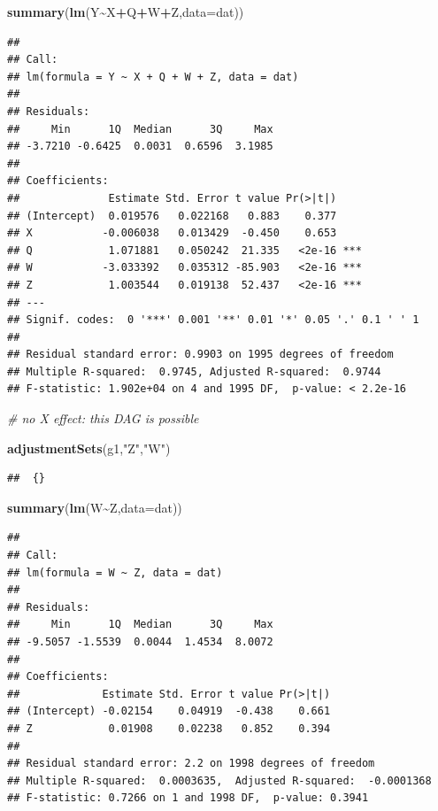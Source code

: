 \documentclass[
]{book}
\newenvironment{Shaded}{\begin{snugshade}}{\end{snugshade}}
\newcommand{\AttributeTok}[1]{\textcolor[rgb]{0.13,0.29,0.53}{#1}}
\newcommand{\CommentTok}[1]{\textcolor[rgb]{0.56,0.35,0.01}{\textit{#1}}}
\newcommand{\FunctionTok}[1]{\textcolor[rgb]{0.13,0.29,0.53}{\textbf{#1}}}
\newcommand{\NormalTok}[1]{#1}
\newcommand{\SpecialCharTok}[1]{\textcolor[rgb]{0.81,0.36,0.00}{\textbf{#1}}}
\newcommand{\StringTok}[1]{\textcolor[rgb]{0.31,0.60,0.02}{#1}}
\begin{document}
\begin{Shaded}
\begin{Highlighting}[]
\FunctionTok{summary}\NormalTok{(}\FunctionTok{lm}\NormalTok{(Y}\SpecialCharTok{\textasciitilde{}}\NormalTok{X}\SpecialCharTok{+}\NormalTok{Q}\SpecialCharTok{+}\NormalTok{W}\SpecialCharTok{+}\NormalTok{Z,}\AttributeTok{data=}\NormalTok{dat))}
\end{Highlighting}
\end{Shaded}

\begin{verbatim}
## 
## Call:
## lm(formula = Y ~ X + Q + W + Z, data = dat)
## 
## Residuals:
##     Min      1Q  Median      3Q     Max 
## -3.7210 -0.6425  0.0031  0.6596  3.1985 
## 
## Coefficients:
##              Estimate Std. Error t value Pr(>|t|)    
## (Intercept)  0.019576   0.022168   0.883    0.377    
## X           -0.006038   0.013429  -0.450    0.653    
## Q            1.071881   0.050242  21.335   <2e-16 ***
## W           -3.033392   0.035312 -85.903   <2e-16 ***
## Z            1.003544   0.019138  52.437   <2e-16 ***
## ---
## Signif. codes:  0 '***' 0.001 '**' 0.01 '*' 0.05 '.' 0.1 ' ' 1
## 
## Residual standard error: 0.9903 on 1995 degrees of freedom
## Multiple R-squared:  0.9745, Adjusted R-squared:  0.9744 
## F-statistic: 1.902e+04 on 4 and 1995 DF,  p-value: < 2.2e-16
\end{verbatim}

\begin{Shaded}
\begin{Highlighting}[]
\CommentTok{\# no X effect: this DAG is possible}

\FunctionTok{adjustmentSets}\NormalTok{(g1,}\StringTok{"Z"}\NormalTok{,}\StringTok{"W"}\NormalTok{)}
\end{Highlighting}
\end{Shaded}

\begin{verbatim}
##  {}
\end{verbatim}

\begin{Shaded}
\begin{Highlighting}[]
\FunctionTok{summary}\NormalTok{(}\FunctionTok{lm}\NormalTok{(W}\SpecialCharTok{\textasciitilde{}}\NormalTok{Z,}\AttributeTok{data=}\NormalTok{dat))}
\end{Highlighting}
\end{Shaded}

\begin{verbatim}
## 
## Call:
## lm(formula = W ~ Z, data = dat)
## 
## Residuals:
##     Min      1Q  Median      3Q     Max 
## -9.5057 -1.5539  0.0044  1.4534  8.0072 
## 
## Coefficients:
##             Estimate Std. Error t value Pr(>|t|)
## (Intercept) -0.02154    0.04919  -0.438    0.661
## Z            0.01908    0.02238   0.852    0.394
## 
## Residual standard error: 2.2 on 1998 degrees of freedom
## Multiple R-squared:  0.0003635,  Adjusted R-squared:  -0.0001368 
## F-statistic: 0.7266 on 1 and 1998 DF,  p-value: 0.3941
\end{verbatim}
\end{document}

